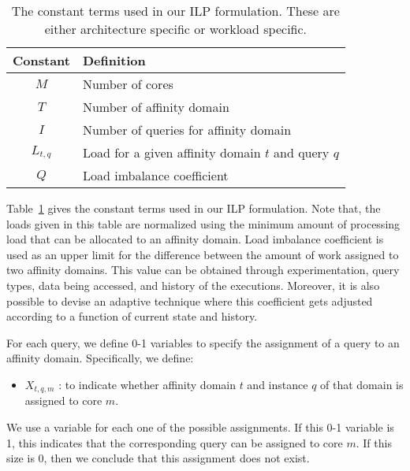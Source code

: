 \begin{table}
\caption{The constant terms used in our ILP formulation. These are either architecture specific or workload specific.}
\label{table:constants}
\begin{center}
\begin{small}
\begin{tabular}{|c|l|}
\hline
{\sf Constant} &  {\sf Definition}    \\
\hline\hline
$M$				& Number of cores\\
$T$				& Number of affinity domain\\
$I$				& Number of queries for affinity domain\\
$L_{t,q}$	& Load for a given affinity domain $t$ and query $q$\\
$Q$				& Load imbalance coefficient\\
\hline
\end{tabular}
\end{small}
\end{center}
\end{table}
Table~\ref{table:constants} gives the constant terms used in our ILP formulation.
Note that, the loads given in this table are normalized using the minimum amount of processing load that can be
allocated to an affinity domain. Load imbalance coefficient is used as an upper limit for the difference 
between the amount of work assigned to two affinity domains. This value can be obtained through experimentation, 
query types, data being accessed, and history of the executions. Moreover, it is also possible to devise an adaptive 
technique where this coefficient gets adjusted according to a function of current state and history.

For each query, we define 0-1 variables to specify
the assignment of a query to an affinity domain. Specifically, we define:
\begin {itemize}
\item $X_{t,q,m}$ : to indicate whether affinity domain $t$ and instance $q$ of that domain is assigned to core $m$.
\end {itemize}

We use a variable for each one of the possible assignments. If this 0-1 variable is 1, this
indicates that the corresponding query can be assigned to core $m$. If this size is 0, then
we conclude that this assignment does not exist.

